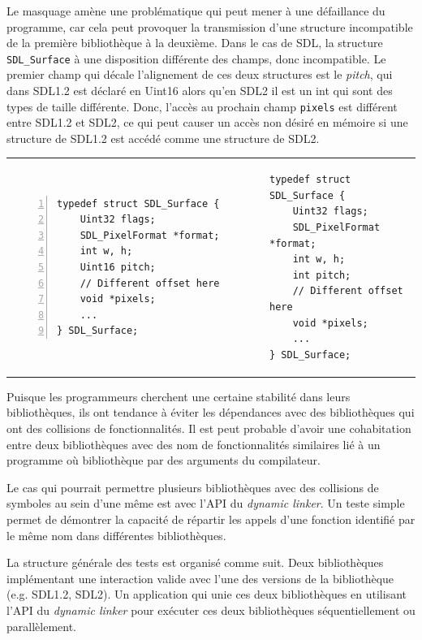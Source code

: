 \documentclass[12pt,initial,twoside,maitrise]{dms}
\numberwithin{equation}{section}
\numberwithin{table}{chapter}
\numberwithin{figure}{chapter}
\begin{document}
Le masquage amène une problématique qui peut mener à une défaillance du programme, car cela peut provoquer
la transmission d'une structure incompatible de la première bibliothèque à la deuxième. Dans le cas de SDL, la structure
\verb+SDL_Surface+ à une disposition différente des champs, donc incompatible.
Le premier champ qui décale l'alignement de ces deux structures est le \textit{pitch},
qui dans SDL1.2 est déclaré en Uint16 alors qu'en SDL2 il est un int qui sont des types de
taille différente. Donc, l'accès au prochain champ \texttt{pixels} est différent entre SDL1.2
et SDL2, ce qui peut causer un accès non désiré en mémoire si une structure de SDL1.2 est accédé comme
une structure de SDL2.
\begin{center}
\begin{tabular}{p{18em}p{18em}}
\begin{lstlisting}[frame=single,numbers=left]
typedef struct SDL_Surface {
    Uint32 flags;
    SDL_PixelFormat *format;
    int w, h;
    Uint16 pitch;
    // Different offset here
    void *pixels;
    ...
} SDL_Surface;
\end{lstlisting}&
\begin{lstlisting}[frame=single,numbers=right]
typedef struct SDL_Surface {
    Uint32 flags;
    SDL_PixelFormat *format;
    int w, h;
    int pitch;
    // Different offset here
    void *pixels;
    ...
} SDL_Surface;
\end{lstlisting}\\
\end{tabular}
\end{center}
Puisque les programmeurs cherchent une certaine stabilité dans leurs bibliothèques, ils ont
tendance à éviter les dépendances avec des bibliothèques qui ont des collisions de fonctionnalités.
Il est peut probable d'avoir une cohabitation entre deux bibliothèques avec des nom de fonctionnalités
similaires lié à un programme où bibliothèque par des arguments du compilateur.

Le cas qui pourrait permettre plusieurs bibliothèques avec des collisions de symboles
au sein d'une même est avec l'API du \textit{dynamic linker}. Un teste simple permet
de démontrer la capacité de répartir les appels d'une fonction identifié par le même nom
dans différentes bibliothèques.

La structure générale des tests est organisé comme suit. Deux bibliothèques implémentant
une interaction valide avec l'une des versions de la bibliothèque (e.g. SDL1.2, SDL2).
Un application qui unie ces deux bibliothèques en utilisant l'API du
\textit{dynamic linker} pour exécuter ces deux bibliothèques séquentiellement ou
parallèlement.
\end{document}
